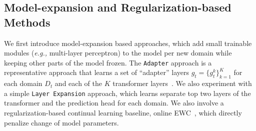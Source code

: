 


\vspace{-0.1cm}
\subsection{Model-expansion and Regularization-based Methods}
\vspace{-0.1cm}

We first introduce model-expansion based approaches, which add small trainable modules (\textit{e.g.,} multi-layer perceptron) to the model per new domain while keeping other parts of the model frozen.
The \texttt{Adapter} approach is a representative approach that learns a set of ``adapter'' layers $g_t = \{g_t^k\}_{k=1}^K$ for each domain $D_t$ and each of the $K$ transformer layers~\cite{houlsby2019parameter}. %
We also experiment with a simple \texttt{Layer Expansion} approach, which learns separate top two layers of the transformer and the prediction head for each domain. %
We also involve a regularization-based continual learning baseline, online EWC~\cite{Schwarz2018ProgressC}, which directly penalize change of model parameters. 

